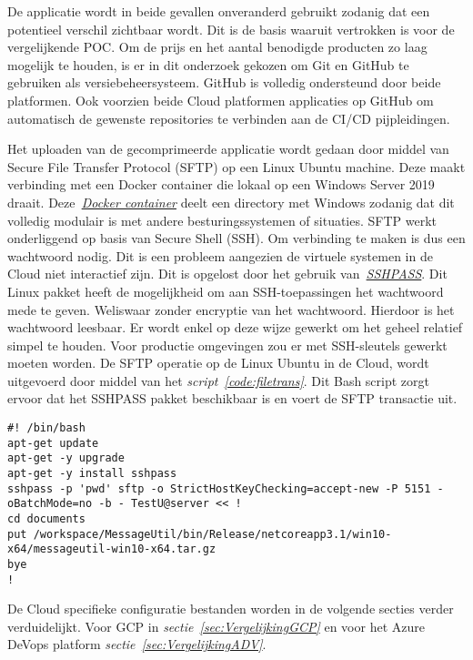 De applicatie wordt in beide gevallen onveranderd gebruikt zodanig dat een potentieel verschil zichtbaar wordt. Dit is de basis waaruit vertrokken is voor de vergelijkende POC. Om de prijs en het aantal benodigde producten zo laag mogelijk te houden, is er in dit onderzoek gekozen om Git en GitHub te gebruiken als versiebeheersysteem. GitHub is volledig ondersteund door beide platformen. Ook voorzien beide Cloud platformen applicaties op GitHub om automatisch de gewenste repositories te verbinden aan de CI/CD pijpleidingen.

Het uploaden van de gecomprimeerde applicatie wordt gedaan door middel van Secure File Transfer Protocol (SFTP) op een Linux Ubuntu machine. Deze maakt verbinding met een Docker container die lokaal op een Windows Server 2019 draait. Deze\emph{~\href{https://hub.docker.com/r/atmoz/sftp/}{Docker container}} deelt een directory met Windows zodanig dat dit volledig modulair is met andere besturingssystemen of situaties. SFTP werkt onderliggend op basis van Secure Shell (SSH). Om verbinding te maken is dus een wachtwoord nodig. Dit is een probleem aangezien de virtuele systemen in de Cloud niet interactief zijn. Dit is opgelost door het gebruik van\emph{~\href{https://linux.die.net/man/1/sshpass}{SSHPASS}}. Dit Linux pakket heeft de mogelijkheid om aan SSH-toepassingen het wachtwoord mede te geven. Weliswaar zonder encryptie van het wachtwoord. Hierdoor is het wachtwoord leesbaar. Er wordt enkel op deze wijze gewerkt om het geheel relatief simpel te houden. Voor productie omgevingen zou er met SSH-sleutels gewerkt moeten worden. De SFTP operatie op de Linux Ubuntu in de Cloud, wordt uitgevoerd door middel van het \emph{script~\ref{code:filetrans}}. Dit Bash script zorgt ervoor dat het SSHPASS pakket beschikbaar is en voert de SFTP transactie uit.

\begin{lstlisting}
#! /bin/bash
apt-get update
apt-get -y upgrade
apt-get -y install sshpass
sshpass -p 'pwd' sftp -o StrictHostKeyChecking=accept-new -P 5151 -oBatchMode=no -b - TestU@server << !
cd documents
put /workspace/MessageUtil/bin/Release/netcoreapp3.1/win10-x64/messageutil-win10-x64.tar.gz
bye
!
\end{lstlisting}

De Cloud specifieke configuratie bestanden worden in de volgende secties verder verduidelijkt. Voor GCP in \emph{sectie~\ref{sec:VergelijkingGCP}} en voor het Azure DeVops platform \emph{sectie~\ref{sec:VergelijkingADV}}.


